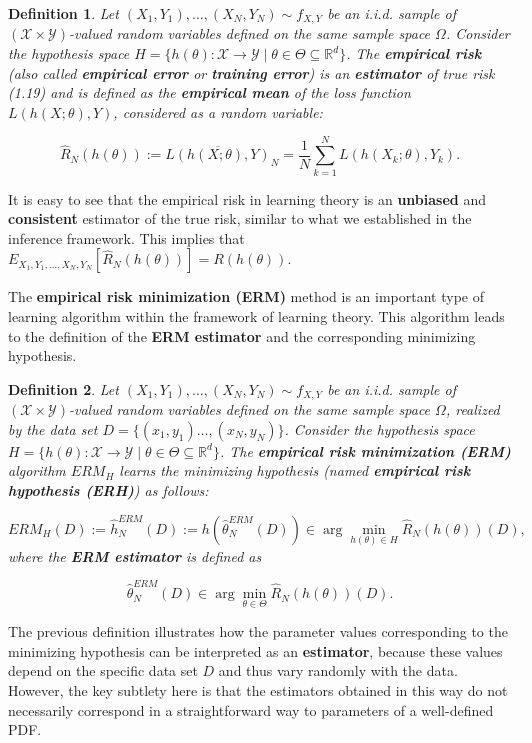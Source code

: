 \documentclass{report}
\newtheorem{definition}{Definition}[chapter]
\begin{document}
\begin{definition}
Let $(X_1, Y_1),\dots,(X_N, Y_N) \sim f_{X,Y}$ be an i.i.d. sample of $(\mathcal{X} \times \mathcal{Y})$-valued random variables defined on the same sample space $\Omega$. Consider the hypothesis space $H=\{h(\theta) : \mathcal{X} \to \mathcal{Y} \mid\theta\in\Theta\subseteq\mathbb{R}^d\}$. The \textbf{empirical risk} (also called \textbf{empirical error} or \textbf{training error}) is an \textbf{estimator} of true risk (1.19) and is defined as the \textbf{empirical mean} of the loss function $L(h(X;\theta), Y)$, considered as a random variable:

\begin{equation}
\hat{R}_N(h(\theta)) := \overline{L(h(X;\theta),Y)}_N = \frac{1}{N}\sum_{k=1}^{N}L(h(X_k;\theta),Y_k).
\end{equation}
\end{definition}
It is easy to see that the empirical risk in learning theory is an \textbf{unbiased} and \textbf{consistent} estimator of the true risk, similar to what we established in the inference framework. This implies that $E_{X_1,Y_1,\dots,X_N,Y_N}[\hat{R}_N(h(\theta))] =  R(h(\theta))$.

The \textbf{empirical risk minimization (ERM)} method is an important type of learning algorithm within the framework of learning theory. This algorithm leads to the definition of the \textbf{ERM estimator} and the corresponding minimizing hypothesis.

\begin{definition}
Let $(X_1, Y_1),\dots,(X_N, Y_N) \sim f_{X,Y}$ be an i.i.d. sample of $(\mathcal{X} \times \mathcal{Y})$-valued random variables defined on the same sample space $\Omega$, realized by the data set $D =\{(x_1, y_1)\dots,(x_N,y_N)\}$. Consider the hypothesis space $H = \{h(\theta) : \mathcal{X} \to \mathcal{Y} \mid\theta\in\Theta\subseteq\mathbb{R}^d\}$. The \textbf{empirical risk minimization (ERM)} algorithm $ERM_H$ learns the minimizing hypothesis (named \textbf{empirical risk hypothesis (ERH)}) as follows:

\begin{equation}
ERM_H(D) := \hat{h}_N^{ERM}(D) := h(\hat{\theta}^{ERM}_N(D)) \in \arg \min_{h(\theta) \in H} \hat{R}_N(h(\theta))(D),
\end{equation}
where the \textbf{ERM estimator} is defined as

\begin{equation}
\hat{\theta}^{ERM}_N(D) \in \arg\min_{\theta \in \Theta}\hat{R}_N(h(\theta))(D).
\end{equation}
\end{definition}
The previous definition illustrates how the parameter values corresponding to the minimizing hypothesis can be interpreted as an \textbf{estimator}, because these values depend on the specific data set $D$ and thus vary randomly with the data. However, the key subtlety here is that the estimators obtained in this way do not necessarily correspond in a straightforward way to parameters of a well-defined PDF.
\end{document}
